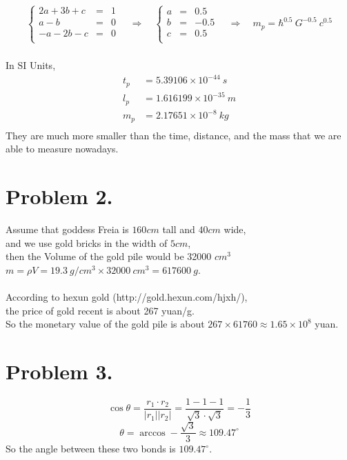 \documentclass{article}
\begin{document}
\begin{eqnarray*}
\left\{
\begin{array}{lll}
2a+3b+c&=&1\\
a-b&=&0\\
-a-2b-c&=&0\\
\end{array}
\right.\quad\Rightarrow\quad
\left\{
\begin{array}{lll}
a&=&0.5\\
b&=&-0.5\\
c&=&0.5\\
\end{array}
\right.\quad\Rightarrow\quad m_{p}=\hbar^{0.5}\ G^{-0.5}\ c^{0.5}
\end{eqnarray*} 
\\
In SI Units,\\
\begin{align*}
t_{p}&=5.39106\times 10^{-44}\ s\\
l_{p}&=1.616199\times 10^{-35}\ m\\
m_{p}&=2.17651\times 10^{-8}\ kg\\
\end{align*}
They are much more smaller than the time, distance, and the mass that we are able to measure nowadays.

\section*{Problem 2.}
Assume that goddess Freia is $160cm$ tall and $40cm$ wide,\\
and we use gold bricks in the width of $5cm$,\\
then the Volume of the gold pile would be 32000 $cm^{3}$\\
$m=\rho V=19.3\ g/cm^{3}\times 32000\ cm^{3}=617600\ g$.\\\\
According to hexun gold (http://gold.hexun.com/hjxh/),\\
the price of gold recent is about 267 yuan/g.\\
So the monetary value of the gold pile is about $267\times 61760\approx 1.65\times 10^{8}$ yuan.

\section*{Problem 3.}
$$\cos \theta=\frac{r_1\cdot r_2}{|r_1||r_2|}=\frac{1-1-1}{\sqrt{3}\cdot\sqrt{3}}=-\frac{1}{3}$$
$$\theta=\arccos -\frac{\sqrt{3}}{3}\approx 109.47^{\circ}$$
So the angle between these two bonds is $109.47^{\circ}$.
\end{document}
